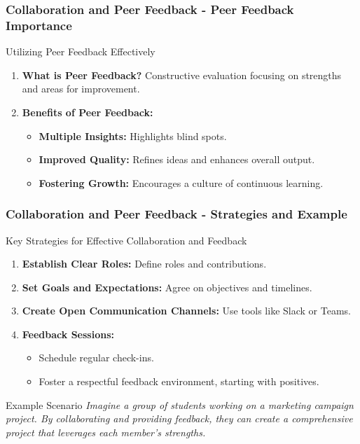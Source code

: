 \documentclass{beamer}
\begin{document}
\begin{frame}[fragile]
    \frametitle{Collaboration and Peer Feedback - Peer Feedback Importance}

    \begin{block}{Utilizing Peer Feedback Effectively}
        \begin{enumerate}
            \item \textbf{What is Peer Feedback?} Constructive evaluation focusing on strengths and areas for improvement.
            \item \textbf{Benefits of Peer Feedback:}
            \begin{itemize}
                \item \textbf{Multiple Insights:} Highlights blind spots.
                \item \textbf{Improved Quality:} Refines ideas and enhances overall output.
                \item \textbf{Fostering Growth:} Encourages a culture of continuous learning.
            \end{itemize}
        \end{enumerate}
    \end{block}
\end{frame}

\begin{frame}[fragile]
    \frametitle{Collaboration and Peer Feedback - Strategies and Example}
    
    \begin{block}{Key Strategies for Effective Collaboration and Feedback}
        \begin{enumerate}
            \item \textbf{Establish Clear Roles:} Define roles and contributions.
            \item \textbf{Set Goals and Expectations:} Agree on objectives and timelines.
            \item \textbf{Create Open Communication Channels:} Use tools like Slack or Teams.
            \item \textbf{Feedback Sessions:}
            \begin{itemize}
                \item Schedule regular check-ins.
                \item Foster a respectful feedback environment, starting with positives.
            \end{itemize}
        \end{enumerate}
    \end{block}
    
    \begin{block}{Example Scenario}
        \textit{Imagine a group of students working on a marketing campaign project. By collaborating and providing feedback, they can create a comprehensive project that leverages each member's strengths.}
    \end{block}
\end{frame}
\end{document}
